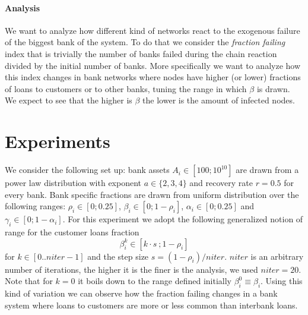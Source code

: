 \documentclass[a4paper, 11pt]{article}
\begin{document}
\paragraph{Analysis}

We want to analyze how different kind of networks react to the exogenous failure of the biggest bank of the system. To do that we consider the \emph{fraction failing} index that is trivially the number of banks failed during the chain reaction divided by the initial number of banks. More specifically we want to analyze how this index changes in bank networks where nodes have higher (or lower) fractions of loans to customers or to other banks, tuning the range in which $\beta$ is drawn. We expect to see that the higher is $\beta$ the lower is the amount of infected nodes.


\section{Experiments} %
\label{sec:experiments}

We consider the following set up: bank assets $A_i \in [100;10^{10}]$ are drawn from a power law distribution with exponent $a \in \{2,3,4\}$ and recovery rate $r = 0.5$ for every bank. Bank specific fractions are drawn from uniform distribution over the following ranges: $\rho_i \in [0;0.25]$, $\beta_i \in [0;1-\rho_i]$, $\alpha_i \in [0;0.25]$ and $\gamma_i \in [0;1-\alpha_i]$. For this experiment we adopt the following generalized notion of range for the customer loans fraction 
\begin{equation}\label{eq:exp1}
	\beta_i^k \in \left[ k \cdot s\ ; 1-\rho_i \right]	
\end{equation}
for $k \in [0..niter-1]$ and the step size $s = (1-\rho_i) / niter$. $niter$ is an arbitrary number of iterations, the higher it is the finer is the analysis, we used $niter = 20$. Note that for $k = 0$ it boils down to the range defined initially $\beta_i^0 \equiv \beta_i$. Using this kind of variation we can observe how the fraction failing changes in a bank system where loans to customers are more or less common than interbank loans.
\end{document}
